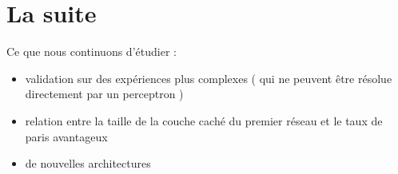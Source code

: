 \documentclass[a4paper,12pt]{article}
\begin{document}
\section{La suite}

Ce que nous continuons d'étudier : 
\begin{itemize}
 \item validation sur des expériences plus complexes ( qui ne peuvent être résolue directement par un perceptron )
 \item relation entre la taille de la couche caché du premier réseau et le taux de paris avantageux
 \item de nouvelles architectures
\end{itemize}




\end{document}

